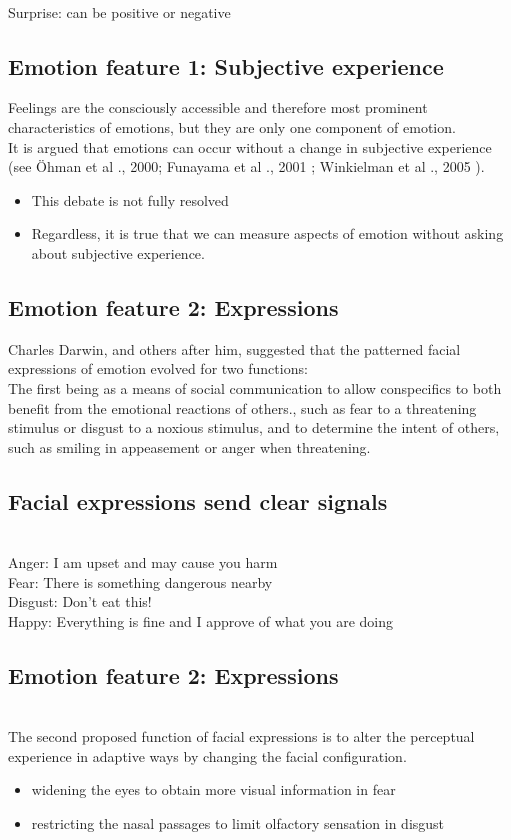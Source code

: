 \\Surprise: can be positive or negative
\subsection{Emotion feature 1: Subjective experience}
Feelings are the consciously accessible and therefore most prominent characteristics of
emotions, but they are only one component of emotion.
\\It is argued that emotions can occur without a change in subjective experience (see
Öhman et al ., 2000; Funayama et al ., 2001 ; Winkielman et al ., 2005 ).
\begin{itemize}
    \item This debate is not fully resolved
\item Regardless, it is true that we can measure aspects of emotion without asking about
subjective experience.
\end{itemize}

\subsection{Emotion feature 2: Expressions}
Charles Darwin, and others after him, suggested that the patterned facial expressions of
emotion evolved for two functions:
\\ The first being as a means of social communication to allow conspecifics to both benefit
from the emotional reactions of others., such as fear to a threatening stimulus or disgust
to a noxious stimulus, and to determine the intent of others, such as smiling in
appeasement or anger when threatening.
\subsection{Facial expressions send clear signals}
\\Anger: I am upset and may cause you harm
\\Fear: There is something dangerous nearby
\\Disgust: Don't eat this!
\\Happy: Everything is fine and I approve of what you are doing
\subsection{Emotion feature 2: Expressions}
\\The second proposed function of facial expressions is to alter the perceptual experience
in adaptive ways by changing the facial configuration.
\begin{itemize}
    \item  widening the eyes to obtain more visual information in fear
    \item restricting the nasal passages to limit olfactory sensation in disgust
\end{itemize}
